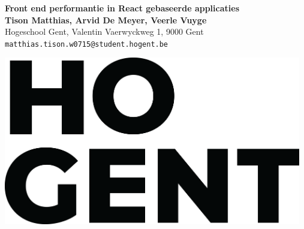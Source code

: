 \documentclass[a0,portrait]{a0poster}
\begin{document}


\begin{minipage}[t]{0.75\linewidth}
\VeryHuge \color{HoGentAccent1} \textbf{Front end performantie in React gebaseerde applicaties} \color{Black}\\ %
\huge \textbf{Tison Matthias, Arvid De Meyer, Veerle Vuyge}\\[0.5cm] %
\huge Hogeschool Gent, Valentin Vaerwyckweg 1, 9000 Gent\\[0.4cm] %
\Large \texttt{matthias.tison.w0715@student.hogent.be} \\
\end{minipage}
%
\begin{minipage}[t]{0.25\linewidth}
\includegraphics[width=13cm,right]{figures/HOGENT_Logo_Pos_rgb.png} 

\end{minipage}

\vspace{1cm} %

\end{document}
